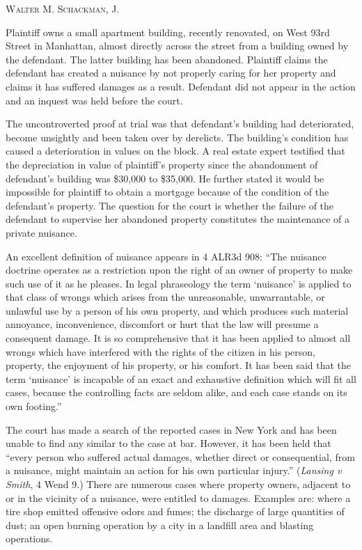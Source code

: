 

\opinion \textsc{Walter M. Schackman}, J.

Plaintiff owns a small apartment building, recently renovated, on West 93rd
Street in Manhattan, almost directly across the street from a building owned by
the defendant. The latter building has been abandoned. Plaintiff claims the
defendant has created a nuisance by not properly caring for her property and
claims it has suffered damages as a result. Defendant did not appear in the
action and an inquest was held before the court.

The uncontroverted proof at trial was that defendant's building had
deteriorated, become unsightly and been taken over by derelicts. The building's
condition has caused a deterioration in values on the block. A real estate
expert testified that the depreciation in value of plaintiff's property since
the abandonment of defendant's building was \$30,000 to \$35,000. He further
stated it would be impossible for plaintiff to obtain a mortgage because of the
condition of the defendant's property. The question for the court is whether the
failure of the defendant to supervise her abandoned property constitutes the
maintenance of a private nuisance.

An excellent definition of nuisance appears in 4 ALR3d 908: ``The nuisance
doctrine operates as a restriction upon the right of an owner of property to
make such use of it as he pleases. In legal phraseology the term `nuisance' is
applied to that class of wrongs which arises from the unreasonable,
unwarrantable, or unlawful use by a person of his own property, and which
produces such material annoyance, inconvenience, discomfort or hurt that the law
will presume a consequent damage. It is so comprehensive that it has been
applied to almost all wrongs which have interfered with the rights of the
citizen in his person, property, the enjoyment of his property, or his comfort.
It has been said that the term `nuisance' is incapable of an exact and
exhaustive definition which will fit all cases, because the controlling facts
are seldom alike, and each case stands on its own footing.''

The court has made a search of the reported cases in New York and has been
unable to find any similar to the case at bar. However, it has been held that
``every person who suffered actual damages, whether direct or consequential,
from a nuisance, might maintain an action for his own particular injury.''
(\textit{Lansing v Smith}, 4 Wend 9.) There are numerous cases where property
owners, adjacent to or in the vicinity of a nuisance, were entitled to damages.
Examples are: where a tire shop emitted offensive odors and fumes; the discharge
of large quantities of dust; an open burning operation by a city in a landfill
area and blasting operations.

